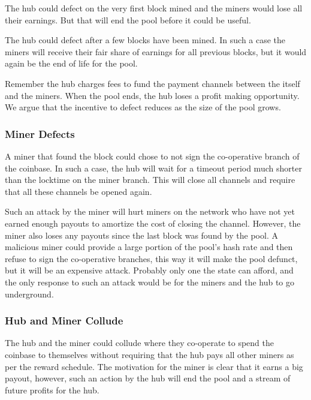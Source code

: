 \documentclass{article}
\begin{document}
The hub could defect on the very first block mined and the miners
would lose all their earnings. But that will end the pool before it
could be useful.

The hub could defect after a few blocks have been mined. In such a
case the miners will receive their fair share of earnings for all
previous blocks, but it would again be the end of life for the pool.

Remember the hub charges fees to fund the payment channels between the
itself and the miners. When the pool ends, the hub loses a profit
making opportunity. We argue that the incentive to defect reduces as
the size of the pool grows.

\subsubsection{Miner Defects}\label{ref:miner-defects}

A miner that found the block could chose to not sign the co-operative
branch of the coinbase. In such a case, the hub will wait for a
timeout period much shorter than the locktime on the miner
branch. This will close all channels and require that all these
channels be opened again.

Such an attack by the miner will hurt miners on the network who have
not yet earned enough payouts to amortize the cost of closing the
channel. However, the miner also loses any payouts since the last
block was found by the pool. A malicious miner could provide a large
portion of the pool's hash rate and then refuse to sign the
co-operative branches, this way it will make the pool defunct, but it
will be an expensive attack. Probably only one the state can afford,
and the only response to such an attack would be for the miners and
the hub to go underground.

\subsubsection{Hub and Miner Collude}\label{ref:collusion}

The hub and the miner could collude where they co-operate to spend the
coinbase to themselves without requiring that the hub pays all other
miners as per the reward schedule. The motivation for the miner is
clear that it earns a big payout, however, such an action by the hub
will end the pool and a stream of future profits for the hub.

\end{document}
